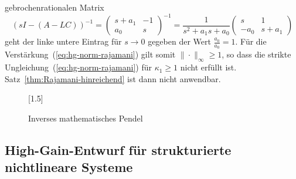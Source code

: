 \begin{example}
gebrochen\-rationalen Matrix
\[
\left(sI-(A-LC)\right)^{-1}=\left(\begin{array}{cc}
s+a_{1} & -1\\
a_{0} & s
\end{array}\right)^{-1}=\frac{1}{s^{2}+a_{1}s+a_{0}}\left(\begin{array}{cc}
s & 1\\
-a_{0} & s+a_{1}
\end{array}\right)
\]
geht der linke untere Eintrag für $s\to0$ gegeben der Wert $\tfrac{a_{0}}{a_{0}}=1$.
Für die Verstärkung~(\ref{eq:hg-norm-rajamani}) gilt somit $\|\cdot\|_{\infty}\geq1$,
so dass die strikte Ungleichung~(\ref{eq:hg-norm-rajamani}) für
$\kappa_{1}\geq1$ nicht erfüllt ist. Satz~\ref{thm:Rajamani-hinreichend}
ist dann nicht anwendbar. 
\end{example}
\begin{figure}
\begin{centering}
\scalebox{1.5}[1.5]{}
\par\end{centering}
\caption{Inverses mathematisches Pendel\label{fig:inverses-mathematisches-Pendel}}
\end{figure}


\subsection{High-Gain-Entwurf für strukturierte nichtlineare Systeme}

